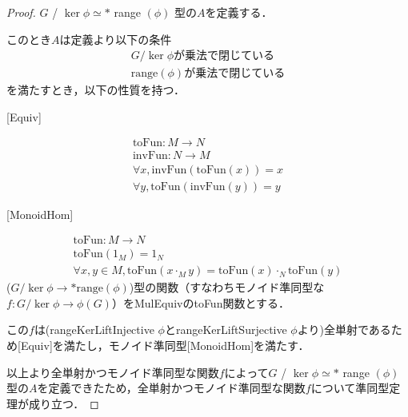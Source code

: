 \begin{proof}
     $G$ / $\ker \phi \simeq *$ range $(\phi)$ 型の$A$を定義する．

     このとき$A$は定義より以下の条件
     \begin{align}
        G / \ker \phi\text{が乗法で閉じている}\\
        \text{range} (\phi)\text{が乗法で閉じている}
     \end{align}
     を満たすとき，以下の性質を持つ．

     [Equiv]

     \begin{align}
        \text{toFun} : M \rightarrow N \\
        \text{invFun} : N \rightarrow M \\
        \forall x , \text{invFun}(\text{toFun}(x))=x\\
        \forall y , \text{toFun}(\text{invFun}(y))=y
     \end{align}

     [MonoidHom]

     \begin{align}
        \text{toFun} : M \rightarrow N\\
        \text{toFun}(1_M)=1_N\\
        \forall x,y \in M,\text{toFun}(x\cdot_M y)=\text{toFun}(x)\cdot_N \text{toFun}(y)
     \end{align}
     ($G / \ker \phi →* \text{range} (\phi)$)型の関数（すなわちモノイド準同型な$f : G / \ker \phi → \phi(G)$）をMulEquivのtoFun関数とする．

     この$f$は(rangeKerLiftInjective $\phi$とrangeKerLiftSurjective $\phi$より)全単射であるため[Equiv]を満たし，モノイド準同型[MonoidHom]を満たす．

     以上より全単射かつモノイド準同型な関数$f$によって$G$ / $\ker \phi \simeq *$ range $(\phi)$ 型の$A$を定義できたため，全単射かつモノイド準同型な関数$f$について準同型定理が成り立つ．
\end{proof}
